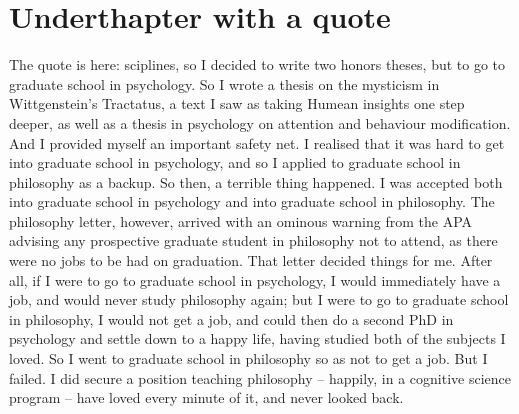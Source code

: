 \documentclass[article,letterpaper,times,12pt,listings-bw,microtype]{memoir}
\begin{document}
\section{Underthapter with a quote}
\label{sec-2}

The quote is here: sciplines, so I decided to write two honors theses, but to go to graduate school in psychology. So I wrote a thesis on the mysticism in Wittgenstein’s Tractatus, a text I saw as taking Humean insights one step deeper, as well as a thesis in psychology on attention and behaviour modification. And I provided myself an important safety net. I realised that it was hard to get into graduate school in psychology, and so I applied to graduate school in philosophy as a backup. So then, a terrible thing happened. I was accepted both into graduate school in psychology and into graduate school in philosophy. The philosophy letter, however, arrived with an ominous warning from the APA advising any prospective graduate student in philosophy not to attend, as there were no jobs to be had on graduation. That letter decided things for me. After all, if I were to go to graduate school in psychology, I would immediately have a job, and would never study philosophy again; but I were to go to graduate school in philosophy, I would not get a job, and could then do a second PhD in psychology and settle down to a happy life, having studied both of the subjects I loved. So I went to graduate school in philosophy so as not to get a job. But I failed. I did secure a position teaching philosophy – happily, in a cognitive science program – have loved every minute of it, and never looked back.
\end{document}
